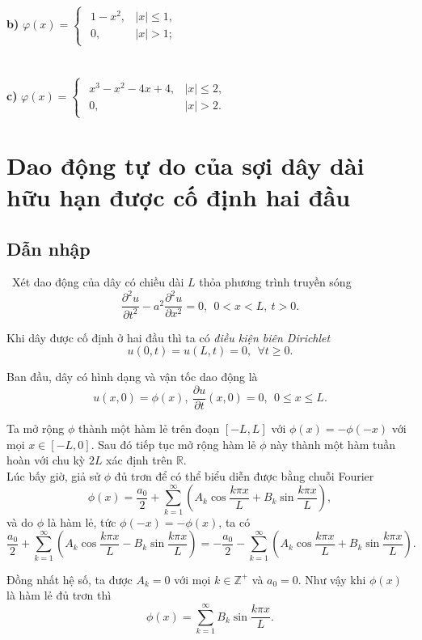 \documentclass[10pt, a4paper]{article}
\begin{document}
	\textbf{b) }$\varphi(x)=\begin{cases}
		\begin{array}{ll}
			1-x^2, & |x|\le1,\\
			0, & |x|>1;
		\end{array}
	\end{cases}$\\\\\\
	\textbf{c) }$\varphi(x)=\begin{cases}
		\begin{array}{ll}
			x^3-x^2-4x+4, & |x|\le2,\\
			0, & |x|>2.
		\end{array}
	\end{cases}$
	\newpage
	\section{Dao động tự do của sợi dây dài hữu hạn được cố định hai đầu}
	\subsection{Dẫn nhập}
	\vspace{1mm}
	\quad\,\,\,Xét dao động của dây có chiều dài $L$ thỏa phương trình truyền sóng $$\frac{\partial^2u}{\partial t^2}-a^2\frac{\partial^2u}{\partial x^2}=0,~~0<x<L,~t>0.$$
	
	Khi dây được cố định ở hai đầu thì ta có \textit{điều kiện biên Dirichlet} $$u(0,t)=u(L,t)=0,~~\forall t\ge0.$$
	
	Ban đầu, dây có hình dạng và vận tốc dao động là $$u(x,0)=\phi(x),~\frac{\partial u}{\partial t}(x,0)=0,~~0\le x\le L.$$
	
	Ta mở rộng $\phi$ thành một hàm lẻ trên đoạn $[-L,L]$ với $\phi(x)=-\phi(-x)$ với mọi $x\in[-L,0]$. Sau đó tiếp tục mở rộng hàm lẻ $\phi$ này thành một hàm tuần hoàn với chu kỳ $2L$ xác định trên $\mathbb R$.\\
	
	Lúc bấy giờ, giả sử $\phi$ đủ trơn để có thể biểu diễn được bằng chuỗi Fourier $$\phi(x)=\frac{a_0}{2}+\sum_{k=1}^\infty\left(A_k\cos\dfrac{k\pi x}{L}+B_k\sin\dfrac{k\pi x}{L}\right),$$
	và do $\phi$ là hàm lẻ, tức $\phi(-x)=-\phi(x)$, ta có $$\frac{a_0}{2}+\sum_{k=1}^\infty\left(A_k\cos\dfrac{k\pi x}{L}-B_k\sin\dfrac{k\pi x}{L}\right)=-\frac{a_0}{2}-\sum_{k=1}^\infty\left(A_k\cos\dfrac{k\pi x}{L}+B_k\sin\dfrac{k\pi x}{L}\right).$$
	
	Đồng nhất hệ số, ta được $A_k=0$ với mọi $k\in\mathbb Z^+$ và $a_0=0$. Như vậy khi $\phi(x)$ là hàm lẻ đủ trơn thì $$\phi(x)=\sum_{k=1}^\infty B_k\sin\dfrac{k\pi x}{L}.$$
	
\end{document}

